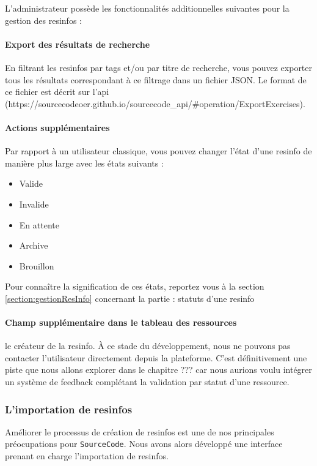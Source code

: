 L'administrateur possède les fonctionnalités additionnelles suivantes pour la gestion des \glspl{resinfo} :

\paragraph{Export des résultats de recherche} En filtrant les \glspl{resinfo} par \glspl{tag} et/ou par titre de recherche, vous pouvez exporter tous les résultats correspondant à ce filtrage dans un fichier JSON. Le format de ce fichier est décrit sur l'api (https://sourcecodeoer.github.io/sourcecode\_api/\#operation/ExportExercises).

\paragraph{Actions supplémentaires} Par rapport à un utilisateur classique, vous pouvez changer l'état d'une \gls{resinfo} de manière plus large avec les états suivants :

\begin{itemize}
    \item Valide
    \item Invalide
    \item En attente
    \item Archive
    \item Brouillon
\end{itemize}

Pour connaître la signification de ces états, reportez vous à la section \ref{section:gestionResInfo} concernant la partie : statuts d'une \gls{resinfo}

\paragraph{Champ supplémentaire dans le tableau des ressources} le créateur de la \gls{resinfo}. À ce stade du développement, nous ne pouvons pas contacter l'utilisateur directement depuis la plateforme. C'est définitivement une piste que nous allons explorer dans le chapitre ??? car nous aurions voulu intégrer un système de feedback complétant la validation par statut d'une ressource.

\subsubsection{L'importation de \glspl{resinfo}}

Améliorer le processus de création de \glspl{resinfo} est une de nos principales préocupations pour \texttt{SourceCode}. Nous avons alors développé une interface prenant en charge l'importation de \glspl{resinfo}.

